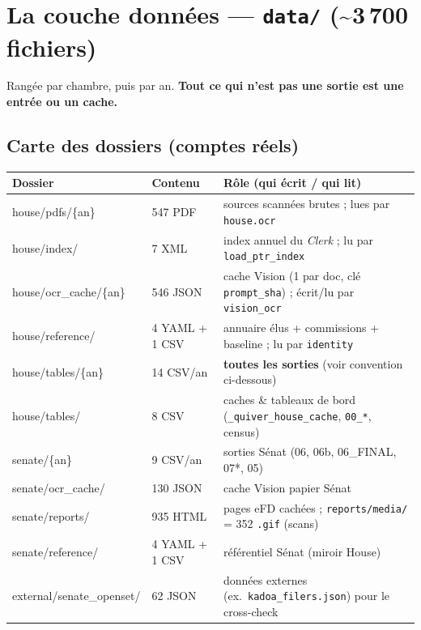 \documentclass[11pt,a4paper]{article}
\newcommand{\co}[1]{\texttt{\small #1}}
\begin{document}
\section{La couche données — \texttt{data/} (\textasciitilde 3\,700 fichiers)}

Rangée par chambre, puis par an. \textbf{Tout ce qui n'est pas une sortie est une entrée ou un cache.}

\subsection{Carte des dossiers (comptes réels)}
{\small
\begin{longtable}{>{\ttfamily\footnotesize}p{3.6cm} p{2.5cm} p{9.4cm}}
\toprule
\normalfont\bfseries Dossier & \bfseries Contenu & \bfseries Rôle (qui écrit / qui lit) \\
\midrule\endhead
house/pdfs/\{an\} & 547 PDF & sources scannées brutes ; lues par \co{house.ocr} \\
house/index/ & 7 XML & index annuel du \emph{Clerk} ; lu par \co{load_ptr_index} \\
house/ocr_cache/\{an\} & 546 JSON & cache Vision (1 par doc, clé \co{prompt_sha}) ; écrit/lu par \co{vision_ocr} \\
house/reference/ & 4 YAML + 1 CSV & annuaire élus + commissions + baseline ; lu par \co{identity} \\
house/tables/\{an\} & 14 CSV/an & \textbf{toutes les sorties} (voir convention ci-dessous) \\
house/tables/ & 8 CSV & caches \& tableaux de bord (\co{_quiver_house_cache}, \co{00_*}, census) \\
senate/\{an\} & 9 CSV/an & sorties Sénat (06, 06b, 06\_FINAL, 07*, 05) \\
senate/ocr_cache/ & 130 JSON & cache Vision papier Sénat \\
senate/reports/ & 935 HTML & pages eFD cachées ; \co{reports/media/} = 352 \co{.gif} (scans) \\
senate/reference/ & 4 YAML + 1 CSV & référentiel Sénat (miroir House) \\
external/senate\_openset/ & 62 JSON & données externes (ex.~\co{kadoa_filers.json}) pour le cross-check \\
\bottomrule
\end{longtable}}
\end{document}
